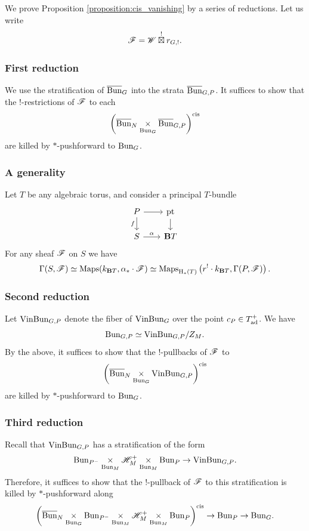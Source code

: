 \subsubsection{} We prove Proposition \ref{proposition:cis_vanishing} by a series of reductions. Let us write
    \[\mathscr{F} = \mathscr{W} \overset{!}{\boxtimes} r_{G,!}.\]

\subsubsection{First reduction} We use the stratification of $\overline{\mathrm{Bun}}_G$ into the strata $\overline{\mathrm{Bun}}_{G,P}$. It suffices to show that the !-restrictions of $\mathscr{F}$ to each
  \[\left(\overline{\mathrm{Bun}}_N \underset{\mathrm{Bun}_G}{\times} \overline{\mathrm{Bun}}_{G,P}\right)^{\mathrm{cis}}\]
are killed by $*$-pushforward to $\mathrm{Bun}_G$.

\subsubsection{A generality} Let $T$ be any algebraic torus, and consider a principal $T$-bundle
\[
\begin{tikzcd}[
  column sep={4em,between origins},
  row sep={3em,between origins}
]
    P \arrow[d, "f" left] \arrow[r] & \pt \arrow[d] \\
    S \arrow[r, "\alpha"] & \BB T
\end{tikzcd}
\]
For any sheaf $\mathscr{F}$ on $S$ we have
    \[\Gamma(S, \mathscr{F}) \simeq \mathrm{Maps}(k_{\mathbf{B} T}, \alpha_* \cdot \mathscr{F}) \simeq \mathrm{Maps}_{\mathrm{H}_*(T)}\left(r^! \cdot k_{\mathbf{B} T}, \Gamma(P, \mathscr{F}) \right).\]

\subsubsection{Second reduction} Let $\mathrm{Vin}\mathrm{Bun}_{G,P}$ denote the fiber of $\mathrm{Vin}\mathrm{Bun}_G$ over the point $c_P \in T_{\mathrm{ad}}^+$. We have
    \[\mathrm{Bun}_{G,P} \simeq \mathrm{Vin}\mathrm{Bun}_{G,P}/Z_M.\]
By the above, it suffices to show that the !-pullbacks of $\mathscr{F}$ to
  \[\left( \overline{\mathrm{Bun}}_N \underset{\mathrm{Bun}_G}{\times} \mathrm{VinBun}_{G,P} \right)^{\mathrm{cis}}\]
are killed by $*$-pushforward to $\mathrm{Bun}_G$.

\subsubsection{Third reduction} Recall that $\mathrm{VinBun}_{G,P}$ has a stratification of the form
\begin{equation}
\label{eqn:VinBun_G_str}
    \mathrm{Bun}_{P^-} \underset{\mathrm{Bun}_M}{\times} \mathscr{H}_M^+ \underset{\mathrm{Bun}_M}{\times} \mathrm{Bun}_P \to \mathrm{VinBun}_{G,P}.      
\end{equation}
Therefore, it suffices to show that the !-pullback of $\mathscr{F}$ to this stratification is killed by $*$-pushforward along
  \[\left( \overline{\mathrm{Bun}}_N \underset{\mathrm{Bun}_G}{\times} \mathrm{Bun}_{P^-} \underset{\mathrm{Bun}_M}{\times} \mathscr{H}_M^+ \underset{\mathrm{Bun}_M}{\times} \mathrm{Bun}_P \right)^{\mathrm{cis}} \to \mathrm{Bun}_P \to \mathrm{Bun}_G.\]

